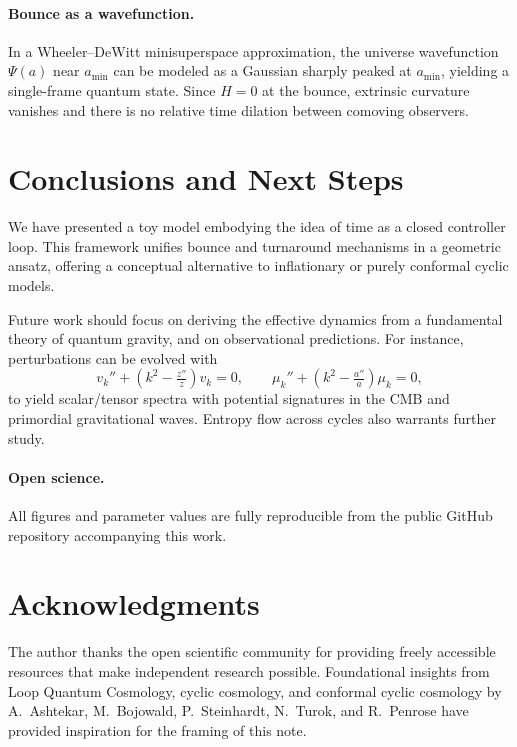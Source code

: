 \documentclass[12pt]{article}
\begin{document}
\paragraph{Bounce as a wavefunction.} In a Wheeler--DeWitt minisuperspace approximation, 
the universe wavefunction $\Psi(a)$ near $a_{\min}$ can be modeled as a Gaussian sharply 
peaked at $a_{\min}$, yielding a single-frame quantum state. Since $H=0$ at the bounce, 
extrinsic curvature vanishes and there is no relative time dilation between comoving observers.

\section{Conclusions and Next Steps}
We have presented a toy model embodying the idea of time as a closed controller loop. This framework 
unifies bounce and turnaround mechanisms in a geometric ansatz, offering a conceptual alternative to 
inflationary or purely conformal cyclic models. 

Future work should focus on deriving the effective dynamics from a fundamental theory of quantum gravity, 
and on observational predictions. For instance, perturbations can be evolved with
\begin{equation}
v_k''+(k^2-\tfrac{z''}{z})v_k=0,\qquad
\mu_k''+(k^2-\tfrac{a''}{a})\mu_k=0,
\end{equation}
to yield scalar/tensor spectra with potential signatures in the CMB and primordial gravitational waves. 
Entropy flow across cycles also warrants further study.

\paragraph{Open science.} All figures and parameter values are fully reproducible from the public GitHub repository accompanying this work.

\section*{Acknowledgments}
The author thanks the open scientific community for providing freely accessible resources 
that make independent research possible. Foundational insights from Loop Quantum Cosmology, 
cyclic cosmology, and conformal cyclic cosmology by A.~Ashtekar, M.~Bojowald, P.~Steinhardt, 
N.~Turok, and R.~Penrose have provided inspiration for the framing of this note.
\end{document}
